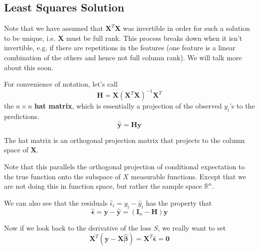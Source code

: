 \subsection{Least Squares Solution}

  Note that we have assumed that $\mathbf{X}^T \mathbf{X}$ was invertible in order for such a solution to be unique, i.e. $\mathbf{X}$ must be full rank. This process breaks down when it isn't invertible, e.g. if there are repetitions in the features (one feature is a linear combination of the others and hence not full column rank). We will talk more about this soon. 

  \begin{definition}
    For convenience of notation, let's call 
    \begin{equation}
      \mathbf{H} = \mathbf{X} (\mathbf{X}^T \mathbf{X})^{-1} \mathbf{X}^T 
    \end{equation}
    the $n \times n$ \textbf{hat matrix}, which is essentially a projection of the observed $y_i$'s to the predictions. 
    \begin{equation}
      \hat{\mathbf{y}} = \mathbf{H} \mathbf{y}
    \end{equation}
  \end{definition}

  \begin{lemma}[Properties]
    The hat matrix is an orthogonal projection matrix that projects to the column space of $\mathbf{X}$. 
  \end{lemma}

  Note that this parallels the orthogonal projection of conditional expectation to the true function onto the subspace of $X$ measurable functions. Except that we are not doing this in function space, but rather the sample space $\mathbb{R}^n$. 

  We can also see that the residuals $\hat{\epsilon}_i = y_i - \hat{y}_i$ has the property that 
  \begin{equation}
    \hat{\boldsymbol{\epsilon}} = \mathbf{y} - \hat{\mathbf{y}} = (\mathbf{I}_n - \mathbf{H}) \mathbf{y} 
  \end{equation}

  Now if we look back to the derivative of the loss $S$, we really want to set 
  \begin{equation}
    \mathbf{X}^T (\mathbf{y} - \mathbf{X} \hat{\boldsymbol{\beta}}) = \mathbf{X}^T \hat{\boldsymbol{\epsilon}} = \mathbf{0}
  \end{equation}
  
